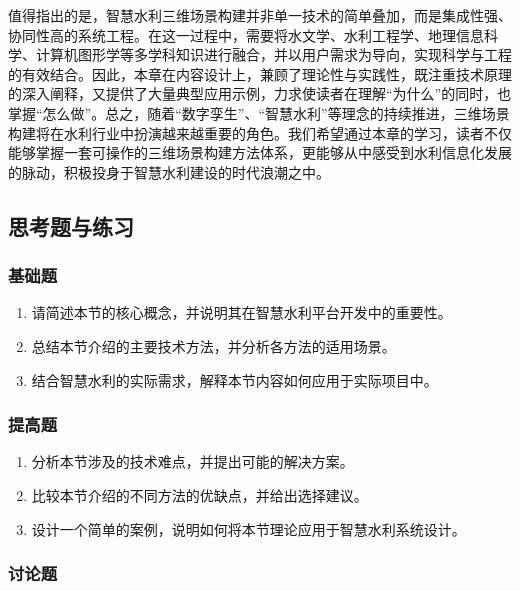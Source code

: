 值得指出的是，智慧水利三维场景构建并非单一技术的简单叠加，而是集成性强、协同性高的系统工程。在这一过程中，需要将水文学、水利工程学、地理信息科学、计算机图形学等多学科知识进行融合，并以用户需求为导向，实现科学与工程的有效结合。因此，本章在内容设计上，兼顾了理论性与实践性，既注重技术原理的深入阐释，又提供了大量典型应用示例，力求使读者在理解``为什么''的同时，也掌握``怎么做''。总之，随着``数字孪生''、``智慧水利''等理念的持续推进，三维场景构建将在水利行业中扮演越来越重要的角色。我们希望通过本章的学习，读者不仅能够掌握一套可操作的三维场景构建方法体系，更能够从中感受到水利信息化发展的脉动，积极投身于智慧水利建设的时代浪潮之中。

\hypertarget{ux601dux8003ux9898ux4e0eux7ec3ux4e60-1}{%
\subsection{思考题与练习}\label{ux601dux8003ux9898ux4e0eux7ec3ux4e60-1}}

\hypertarget{ux57faux7840ux9898-1}{%
\subsubsection{基础题}\label{ux57faux7840ux9898-1}}

\begin{enumerate}
\def\labelenumi{\arabic{enumi}.}
\tightlist
\item
  请简述本节的核心概念，并说明其在智慧水利平台开发中的重要性。
\item
  总结本节介绍的主要技术方法，并分析各方法的适用场景。
\item
  结合智慧水利的实际需求，解释本节内容如何应用于实际项目中。
\end{enumerate}

\hypertarget{ux63d0ux9ad8ux9898-1}{%
\subsubsection{提高题}\label{ux63d0ux9ad8ux9898-1}}

\begin{enumerate}
\def\labelenumi{\arabic{enumi}.}
\tightlist
\item
  分析本节涉及的技术难点，并提出可能的解决方案。
\item
  比较本节介绍的不同方法的优缺点，并给出选择建议。
\item
  设计一个简单的案例，说明如何将本节理论应用于智慧水利系统设计。
\end{enumerate}

\hypertarget{ux8ba8ux8bbaux9898-1}{%
\subsubsection{讨论题}\label{ux8ba8ux8bbaux9898-1}}

